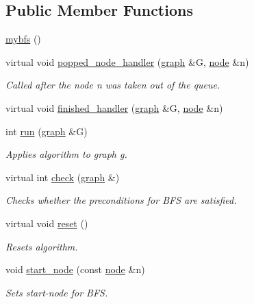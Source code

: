 \subsection*{Public Member Functions}
\begin{DoxyCompactItemize}
\item 
\mbox{\hyperlink{classmybfs_a6eef20e8718e28577e66de8d0d6816a4}{mybfs}} ()
\item 
virtual void \mbox{\hyperlink{classmybfs_a9d6e9e39f16d92ce1bcf368fe92b6856}{popped\+\_\+node\+\_\+handler}} (\mbox{\hyperlink{classgraph}{graph}} \&G, \mbox{\hyperlink{classnode}{node}} \&n)
\begin{DoxyCompactList}\small\item\em Called after the node {\itshape n} was taken out of the queue. \end{DoxyCompactList}\item 
virtual void \mbox{\hyperlink{classmybfs_a6e1c4d4e0b68caf0e3b7cc14d15da537}{finished\+\_\+handler}} (\mbox{\hyperlink{classgraph}{graph}} \&G, \mbox{\hyperlink{classnode}{node}} \&n)
\item 
int \mbox{\hyperlink{classbfs_a06ae16bd0f3bb2f8eb6b3e36659ba82e}{run}} (\mbox{\hyperlink{classgraph}{graph}} \&G)
\begin{DoxyCompactList}\small\item\em Applies algorithm to graph g. \end{DoxyCompactList}\item 
virtual int \mbox{\hyperlink{classbfs_aafdf63b57eaceb5d95f441be0f9c77bb}{check}} (\mbox{\hyperlink{classgraph}{graph}} \&)
\begin{DoxyCompactList}\small\item\em Checks whether the preconditions for B\+FS are satisfied. \end{DoxyCompactList}\item 
virtual void \mbox{\hyperlink{classbfs_a6398bc230f9723cd5fdd32cd603647cc}{reset}} ()
\begin{DoxyCompactList}\small\item\em Resets algorithm. \end{DoxyCompactList}\item 
void \mbox{\hyperlink{classbfs_a23e2981c2ee617a6e12a8833d2db6210}{start\+\_\+node}} (const \mbox{\hyperlink{classnode}{node}} \&n)
\begin{DoxyCompactList}\small\item\em Sets start-\/node for B\+FS. \end{DoxyCompactList}\item 

\end{DoxyCompactItemize}
